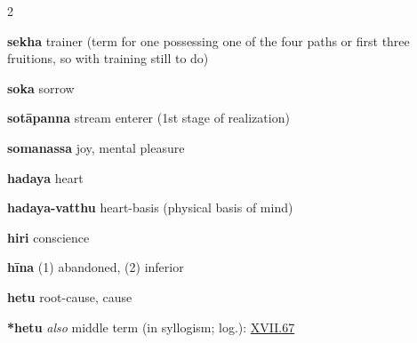 \begin{multicols}{2}
\begin{vismHanging}
\par\textbf{sekha} trainer (term for one possessing one of the four paths or first three fruitions, so with training still to do) 
\par\textbf{soka} sorrow 
\par\textbf{sotāpanna} stream enterer (1st stage of realization) 
\par\textbf{somanassa} joy, mental pleasure
\par\textbf{hadaya} heart
\par\textbf{hadaya-vatthu} heart-basis (physical basis of mind)
\par\textbf{hiri} conscience
\par\textbf{hīna} (1) abandoned, (2) inferior
\par\textbf{hetu} root-cause, cause
\par\textbf{*hetu} \emph{also }middle  term  (in  syllogism; log.): \hyperlink{XVII.67}{XVII.67}{}
\end{vismHanging}\end{multicols}